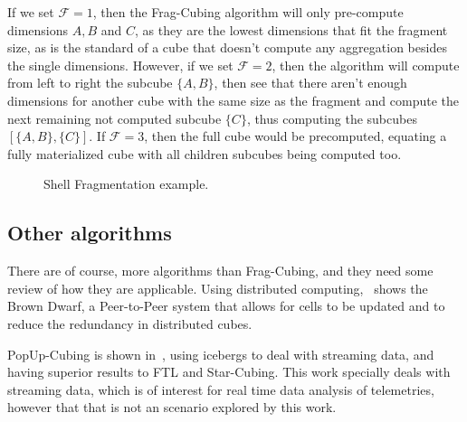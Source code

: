 If we set $\mathcal{F} = 1$, then the Frag-Cubing algorithm will only pre-compute dimensions $A, B$ and $C$, as they are the lowest dimensions that fit the fragment size, as is the standard of a cube that doesn't compute any aggregation besides the single dimensions.
However, if we set $\mathcal{F} = 2$, then the algorithm will compute from left to right the subcube $\{A, B\}$, then see that there aren't enough dimensions for another cube with the same size as the fragment and compute the next remaining not computed subcube $\{C\}$, thus computing the subcubes $[\{A, B\}, \{C\}]$.
If $\mathcal{F} = 3$, then the full cube would be precomputed, equating a fully materialized cube with all children subcubes being computed too.

\begin{figure}[!htb]
  \caption{Shell Fragmentation example.}\label{fig:hasseexample}
  \vspace{2mm}
  \begin{center}
  \end{center}
  \vspace{1mm}
  \legenda{}
\end{figure}

\subsection{Other algorithms}\label{ch:corr:cube:others}

There are of course, more algorithms than Frag-Cubing, and they need some review of how they are applicable.
Using distributed computing,~ shows the Brown Dwarf, a Peer-to-Peer system that allows for cells to be updated and to reduce the redundancy in distributed cubes.

PopUp-Cubing is shown in~, using icebergs to deal with streaming data, and having superior results to FTL and Star-Cubing.
This work specially deals with streaming data, which is of interest for real time data analysis of telemetries, however that that is not an scenario explored by this work.

